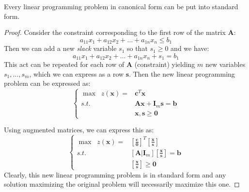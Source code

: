 \begin{theorem}Every linear programming problem in canonical form can be put into standard form.
\end{theorem}
\begin{proof} Consider the constraint corresponding to the first row of the matrix $\mathbf{A}$:
\begin{equation}
a_{11}x_1 + a_{12}x_2 + \dots + a_{1n}x_n \leq b_1
\end{equation}
Then we can add a new \textit{slack} variable $s_1$ so that $s_1 \geq 0$ and we have:
\begin{equation}
a_{11}x_1 + a_{12}x_2 + \dots + a_{1n}x_n + s_1 = b_1
\end{equation}
This act can be repeated for each row of $\mathbf{A}$ (constraint) yielding $m$ new variables $s_1,\dots,s_m$, which we can express as a row $\mathbf{s}$. Then the new linear programming problem can be expressed as:
\begin{displaymath}
\left\{
\begin{aligned}
\max\;\; z(\mathbf{x}) = &\mathbf{c}^T\mathbf{x}\\
s.t.\;\;&\mathbf{A}\mathbf{x} + \mathbf{I}_m\mathbf{s}= \mathbf{b}\\
& \mathbf{x},\mathbf{s} \geq \mathbf{0}
\end{aligned}\right.
\label{eqn:CanonicalFormMax}
\end{displaymath}

Using augmented matrices, we can express this as:
\begin{displaymath}
\left\{
\begin{aligned}
\max\;\; z(\mathbf{x}) = &\left[\frac{\mathbf{c}}{\mathbf{0}}\right]^T\left[\frac{\mathbf{x}}{\mathbf{s}}\right]\\
s.t.\;\;&\left[\mathbf{A}|\mathbf{I}_m\right]\left[\frac{\mathbf{x}}{\mathbf{s}}\right]= \mathbf{b}\\
& \left[\frac{\mathbf{x}}{\mathbf{s}}\right] \geq \mathbf{0}
\end{aligned}\right.
\label{eqn:CanonicalFormMax}
\end{displaymath}
Clearly, this new linear programming problem is in standard form and any solution maximizing the original problem will necessarily maximize this one.
\end{proof}

